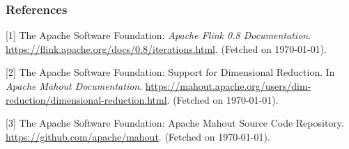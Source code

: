 \subsubsection*{References}


\small{
[1] The Apache Software Foundation: {\it Apache Flink 0.8 Documentation}. 
\url{https://flink.apache.org/docs/0.8/iterations.html}. (Fetched on \today).

[2] The Apache Software Foundation: Support for Dimensional Reduction. In
{\it Apache Mahout Documentation}.
\url{https://mahout.apache.org/users/dim-reduction/dimensional-reduction.html}.
(Fetched on \today).

[3] The Apache Software Foundation: Apache Mahout Source Code Repository.
\url{https://github.com/apache/mahout}. (Fetched on \today).
}
